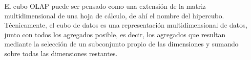 \documentclass{fancyslides}
\begin{document}
\begin{frame}
\end{frame}


\begin{frame}
\end{frame}

\begin{frame}
\end{frame}

\begin{frame}
\end{frame}

\begin{frame}
\end{frame}

\begin{frame}
\misc
{
El cubo OLAP puede ser pensado como una extensión de la matriz multidimensional de una hoja de cálculo, de ahí el nombre del hipercubo. Técnicamente, el cubo de datos es una representación multidimensional de datos, junto con todos los agregados posible, es decir, los agregados que resultan mediante la selección de un subconjunto propio de las dimensiones y sumando sobre todas las dimensiones restantes.
}
\end{frame}
\end{document}
